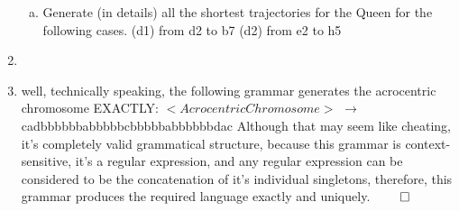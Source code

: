 \documentclass[11pt]{article}
\begin{document}
\begin{enumerate}
\begin{enumerate}[(a)]
\item Generate (in details) all the shortest trajectories for the Queen for the following cases. (d1) from d2 to b7 (d2) from e2 to h5
\end{enumerate}
\item
\item well, technically speaking, the following grammar generates the acrocentric chromosome EXACTLY: 
$<Acrocentric Chromosome>$ $\rightarrow$ cadbbbbbbabbbbbcbbbbbabbbbbbdac
Although that may seem like cheating, it's completely valid grammatical structure, because this grammar is context-sensitive, it's a regular expression, and any regular expression can be considered to be the concatenation of it's individual singletons, therefore, this grammar produces the required language exactly and uniquely. $\qed$
\end{enumerate}
\end{document}
